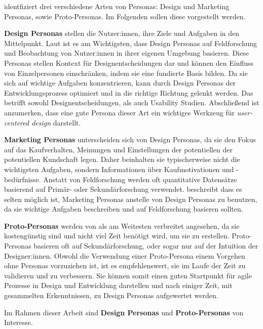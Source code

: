 \textcite{tomlinUXOptimization2018} identfiziert drei verschiedene Arten von Personas: Design und Marketing Personas, sowie Proto-Personas. Im Folgenden sollen diese vorgestellt werden.

\textbf{Design Personas} stellen die Nutzer:innen, ihre Ziele und Aufgaben in den Mittelpunkt. Laut \textcite{tomlinUXOptimization2018} ist es am Wichtigsten, dass Design Personas auf Feldforschung und Beobachtung von Nutzer:innen in ihrer eigenen Umgebung basieren. Diese Personas stellen Kontext für Designentscheidungen dar und können den Einfluss von Einzelpersonen einschränken, indem sie eine fundierte Basis bilden.  Da sie sich auf wichtige Aufgaben konzentrieren, kann durch Design Personas der Entwicklungsprozess optimiert und in die richtige Richtung gelenkt werden. Das betrifft sowohl Designentscheidungen, als auch Usability Studien. Abschließend ist anzumerken, dass eine gute Persona dieser Art ein wichtiges Werkzeug für \textit{user-centered design} darstellt.
\parencite{tomlinUXOptimization2018}

\textbf{Marketing Personas} unterscheiden sich von Design Personas, da sie den Fokus auf das Kaufverhalten, Meinungen und Einstellungen der potentiellen der potentiellen Kundschaft legen. Daher beinhalten sie typischerweise nicht die wichtigsten Aufgaben, sondern Informationen über Kaufmotivationen und -bedürfnisse. Anstatt von Feldforschung werden oft quantitative Datensätze basierend auf Primär- oder Sekundärforschung verwendet. \textcite{tomlinUXOptimization2018} beschreibt dass es selten möglich ist, Marketing Personas anstelle von Design Personas zu benutzen, da sie wichtige Aufgaben beschreiben und auf Feldforschung basieren sollten.
\parencite{tomlinUXOptimization2018}

\textbf{Proto-Personas} werden von \textcite{tomlinUXOptimization2018} als am Weitesten verbreitet angesehen, da sie kostengünstig sind und nicht viel Zeit benötigt wird, um sie zu erstellen. Proto-Personas basieren oft auf Sekundärforschung, oder sogar nur auf der Intuition der Designer:innen. Obwohl die Verwendung einer Proto-Persona einem Vorgehen ohne Personas vorzuziehen ist, ist es empfehlenswert, sie im Laufe der Zeit zu validieren und zu verbessern. Sie können somit einen guten Startpunkt für agile Prozesse in Design und Entwicklung darstellen und nach einiger Zeit, mit gesammelten Erkenntnissen, zu Design Personas aufgewertet werden.
\parencite{tomlinUXOptimization2018}

Im Rahmen dieser Arbeit sind \textbf{Design Personas} und \textbf{Proto-Personas} von Interesse.

